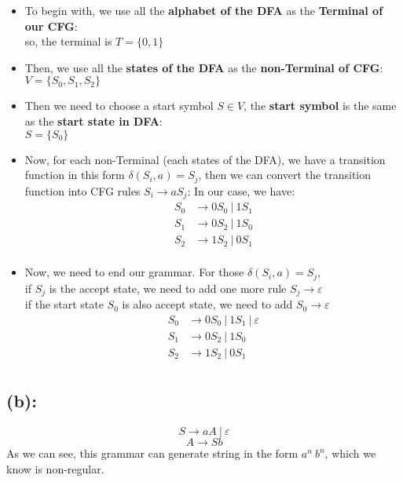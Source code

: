\documentclass [9 pt]{article}
\theoremstyle{definition}
\begin{document}
\begin{itemize}
	\item To begin with, we use all the \textbf{alphabet of the DFA} as the \textbf{Terminal of our CFG}:\\
	so, the terminal is $T = \{ 0, 1 \}$
	\item Then, we use all the \textbf{states of the DFA} as the \textbf{non-Terminal of CFG}:\\
	$V = \{ S_0, S_1, S_2 \}$
	\item Then we need to choose a start symbol $S \in V$, the \textbf{start symbol} is the same as the \textbf{start state in DFA}:\\
	$S = \{ S_0 \}$
	\item Now, for each non-Terminal (each states of the DFA), we have a transition function in this form $\delta(S_i, a) = S_j$, then we can convert the transition function into CFG rules $S_i \to aS_j$:
	In our case, we have:
	\begin{align*}
		S_0 &\to 0S_0\ |\ 1S_1\\
		S_1 &\to 0S_2\ |\ 1S_0\\
		S_2 &\to 1S_2\ |\ 0S_1\\
	\end{align*}
	\item Now, we need to end our grammar. For those $\delta(S_i, a) = S_j$, \\
	if $S_j$ is the accept state, we need to add one more rule $S_j \to \varepsilon$\\
	if the start state $S_0$ is also accept state, we need to add $S_0 \to \varepsilon $
	\begin{align*}
		S_0 &\to 0S_0\ |\ 1S_1\ |\ \varepsilon \\
		S_1 &\to 0S_2\ |\ 1S_0\\
		S_2 &\to 1S_2\ |\ 0S_1\\
	\end{align*}
\end{itemize} 
 




\subsection*{(b):} 
$$ S \to aA\ |\ \varepsilon$$
$$ A \to Sb  $$
As we can see, this grammar can generate string in the form $a^n\ b^n$, which we know is non-regular.
\end{document}
